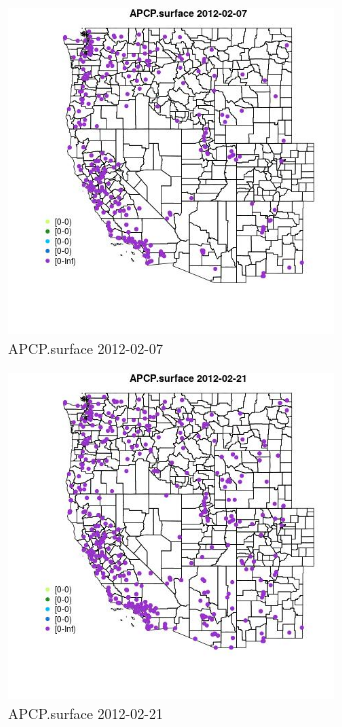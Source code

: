 \begin{figure} 
\centering  
\includegraphics[width=0.77\textwidth]{Code_Outputs/Report_ML_input_PM25_Step4_part_f_de_duplicated_aveswNAs_MapObsAPCPsurface2012-02-07.jpg} 
\caption{\label{fig:Report_ML_input_PM25_Step4_part_f_de_duplicated_aveswNAsMapObsAPCPsurface2012-02-07}APCP.surface 2012-02-07} 
\end{figure} 
 

\begin{figure} 
\centering  
\includegraphics[width=0.77\textwidth]{Code_Outputs/Report_ML_input_PM25_Step4_part_f_de_duplicated_aveswNAs_MapObsAPCPsurface2012-02-21.jpg} 
\caption{\label{fig:Report_ML_input_PM25_Step4_part_f_de_duplicated_aveswNAsMapObsAPCPsurface2012-02-21}APCP.surface 2012-02-21} 
\end{figure} 
 

